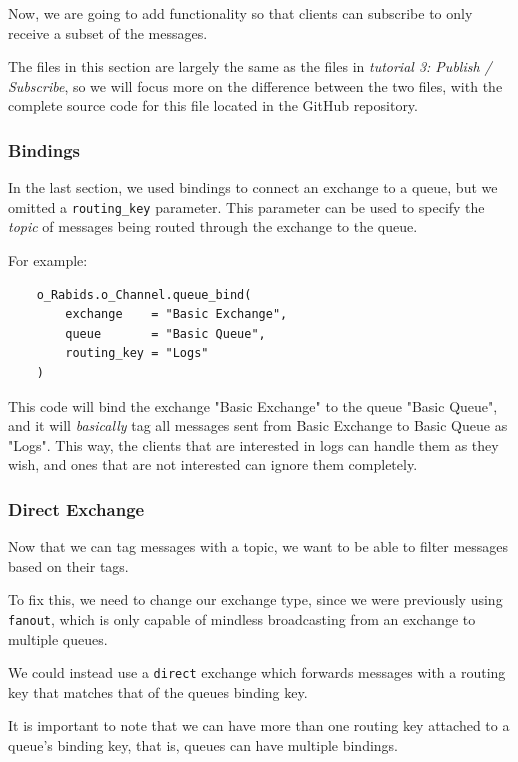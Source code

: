 \documentclass{article}
\begin{document}
Now, we are going to add functionality so that clients can subscribe to only receive a subset of the messages.

The files in this section are largely the same as the files in \textit{tutorial 3: Publish / Subscribe}, so we will focus more on the difference between the two files, with the complete source code for this file located in the GitHub repository.

\subsubsection{Bindings}

In the last section, we used bindings to connect an exchange to a queue, but we omitted a \verb|routing_key| parameter. This parameter can be used to specify the \textit{topic} of messages being routed through the exchange to the queue.

For example:

\begin{verbatim}
    o_Rabids.o_Channel.queue_bind(
        exchange    = "Basic Exchange",
        queue       = "Basic Queue",
        routing_key = "Logs"
    )
\end{verbatim}

This code will bind the exchange "Basic Exchange" to the queue "Basic Queue", and it will \textit{basically} tag all messages sent from Basic Exchange to Basic Queue as "Logs". This way, the clients that are interested in logs can handle them as they wish, and ones that are not interested can ignore them completely.

\subsubsection{Direct Exchange}

Now that we can tag messages with a topic, we want to be able to filter messages based on their tags. 

To fix this, we need to change our exchange type, since we were previously using \verb|fanout|, which is only capable of mindless broadcasting from an exchange to multiple queues.

We could instead use a \verb|direct| exchange which forwards messages with a routing key that matches that of the queues binding key.

It is important to note that we can have more than one routing key attached to a queue's binding key, that is, queues can have multiple bindings.
\end{document}
